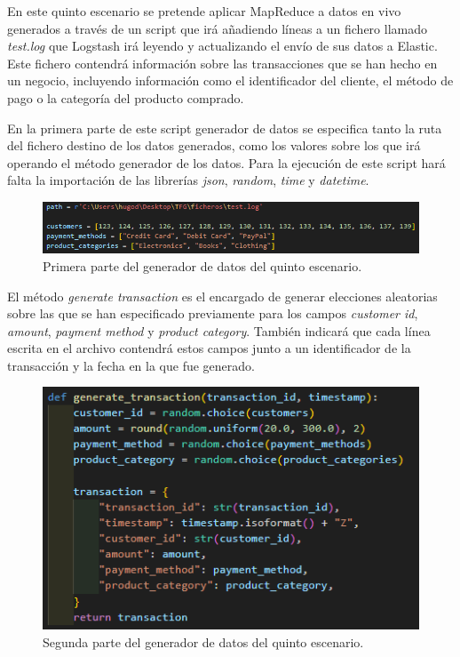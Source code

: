 En este quinto escenario se pretende aplicar MapReduce a datos en vivo generados a través de un script que irá añadiendo líneas a un fichero llamado \textit{test.log} que Logstash irá leyendo y actualizando el envío de sus datos a Elastic. Este fichero contendrá información sobre las transacciones que se han hecho en un negocio, incluyendo información como el identificador del cliente, el método de pago o la categoría del producto comprado.

En la primera parte de este script generador de datos se especifica tanto la ruta del fichero destino de los datos generados, como los valores sobre los que irá operando el método generador de los datos. Para la ejecución de este script hará falta la importación de las librerías \textit{json}, \textit{random}, \textit{time} y \textit{datetime}.
\begin{figure}
    \centering
    \includegraphics[width=1\linewidth]{img/escenario51.png}
    \caption{Primera parte del generador de datos del quinto escenario.}
    \label{fig:generador1}
\end{figure}

El método \textit{generate transaction} es el encargado de generar elecciones aleatorias sobre las que se han especificado previamente para los campos \textit{customer id}, \textit{amount}, \textit{payment method} y \textit{product category}. También indicará que cada línea escrita en el archivo contendrá estos campos junto a un identificador de la transacción y la fecha en la que fue generado.
\begin{figure}
    \centering
    \includegraphics[width=1\linewidth]{img/escenario52.png}
    \caption{Segunda parte del generador de datos del quinto escenario.}
    \label{fig:generador2}
\end{figure}

